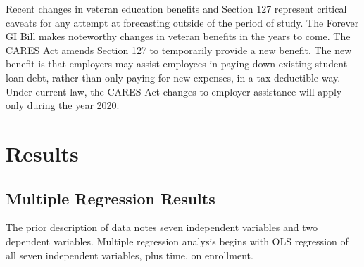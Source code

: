 \documentclass[review]{elsarticle}
\begin{document}
Recent changes in veteran education benefits and Section 127
represent critical caveats for any attempt at forecasting outside of the period of study.
The Forever GI Bill makes noteworthy changes in veteran benefits in the years to come.
The CARES Act amends Section 127 to temporarily provide a new benefit\cite{schiavo_2020}.
The new benefit is that employers may assist employees in paying down existing student loan debt,
rather than only paying for new expenses, in a tax-deductible way.
Under current law, the CARES Act changes to employer assistance will apply only during the year 2020.


\section{Results}


\subsection{Multiple Regression Results}
The prior description of data notes seven independent variables and two dependent variables.
Multiple regression analysis begins with OLS regression of all seven independent variables,
plus time, on enrollment.
\end{document}
